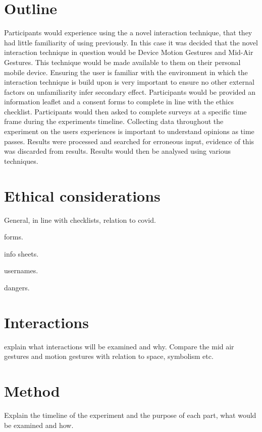 \documentclass{l4proj}
\begin{document}
\section{Outline}
Participants would experience using the a novel interaction technique, that they had little familiarity of using previously. In this case it was decided that the novel interaction technique in question would be Device Motion Gestures and Mid-Air Gestures. This technique would be made available to them on their personal mobile device. Ensuring the user is familiar with the environment in which the interaction technique is build upon is very important to ensure no other external factors on unfamiliarity infer secondary effect. Participants would be provided an information leaflet and a consent forms to complete in line with the ethics checklist. Participants would then asked to complete surveys at a specific time frame during the experiments timeline. Collecting data throughout the experiment on the users experiences is important to understand opinions as time passes. Results were processed and searched for erroneous input, evidence of this was discarded from results. Results would then be analysed using various techniques.

\section{Ethical considerations}
General, in line with checklists, relation to covid.

forms.

info sheets.

usernames.

dangers.

\section{Interactions}
explain what interactions will be examined and why. Compare the mid air gestures and motion gestures with relation to space, symbolism etc.

\section{Method}
Explain the timeline of the experiment and the purpose of each part, what would be examined and how.

\end{document}
